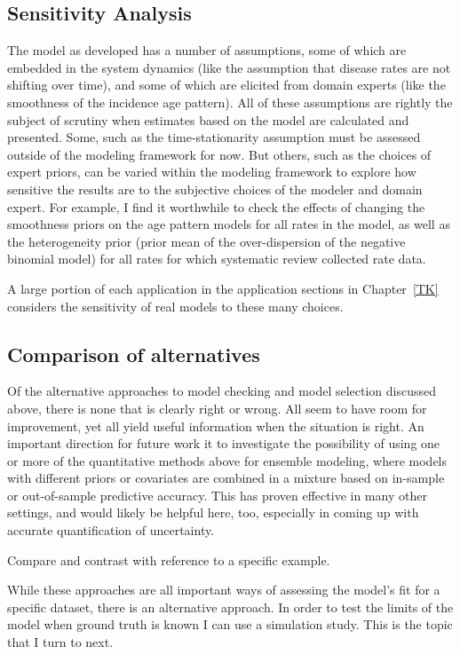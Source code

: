 \subsection{Sensitivity Analysis}
The model as developed has a number of assumptions, some of which are
embedded in the system dynamics (like the assumption that disease
rates are not shifting over time), and some of which are elicited from
domain experts (like the smoothness of the incidence age pattern).
All of these assumptions are rightly the subject of scrutiny when
estimates based on the model are calculated and presented.  Some, such
as the time-stationarity assumption must be assessed outside of the
modeling framework for now.  But others, such as the choices of expert
priors, can be varied within the modeling framework to explore how
sensitive the results are to the subjective choices of the modeler and
domain expert.  For example, I find it worthwhile to check the effects
of changing the smoothness priors on the age pattern models for all
rates in the model, as well as the heterogeneity prior (prior mean of
the over-dispersion of the negative binomial model) for all rates for
which systematic review collected rate data.

A large portion of each application in the application sections in Chapter~\ref{TK}
considers the sensitivity of real models to these many choices.

\subsection{Comparison of alternatives}
Of the alternative approaches to model checking and model selection
discussed above, there is none that is clearly right or wrong.  All
seem to have room for improvement, yet all yield useful information
when the situation is right.  An important direction for future work
it to investigate the possibility of using one or more of the
quantitative methods above for ensemble modeling, where models with
different priors or covariates are combined in a mixture based on
in-sample or out-of-sample predictive accuracy.  This has proven
effective in many other settings, and would likely be helpful here,
too, especially in coming up with accurate quantification of
uncertainty.

Compare and contrast with reference to a specific example.

While these approaches are all important ways of assessing the model's
fit for a specific dataset, there is an alternative approach.  In
order to test the limits of the model when ground truth is known I can
use a simulation study.  This is the topic that I turn to next.

